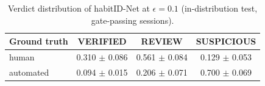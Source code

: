 \begin{table}[t]
\caption{Verdict distribution of habitID-Net at $\epsilon{=}0.1$ (in-distribution test, gate-passing sessions).}
\label{tab:verdicts}
\centering
\small
\begin{tabular}{lccc}
\toprule
Ground truth & VERIFIED & REVIEW & SUSPICIOUS \\
\midrule
human & 0.310 $\pm$ 0.086 & 0.561 $\pm$ 0.084 & 0.129 $\pm$ 0.053 \\
automated & 0.094 $\pm$ 0.015 & 0.206 $\pm$ 0.071 & 0.700 $\pm$ 0.069 \\
\bottomrule
\end{tabular}
\end{table}
